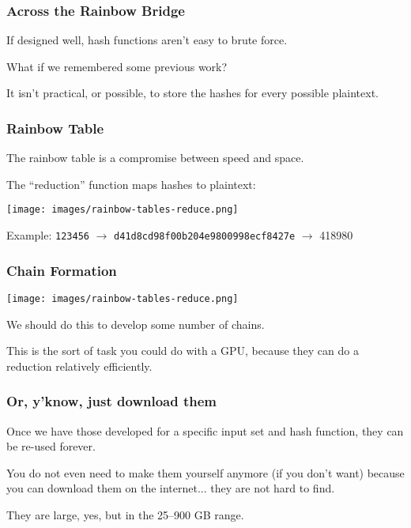 \begin{frame}
\frametitle{Across the Rainbow Bridge}

If designed well, hash functions aren't easy to brute force.

What if we remembered some previous work? 

It isn't practical, or possible, to store the hashes for every possible plaintext.

\end{frame}


\begin{frame}
\frametitle{Rainbow Table}

The rainbow table is a compromise between speed and space. 

The ``reduction'' function maps hashes to plaintext:

\begin{center}
	\texttt{[image: images/rainbow-tables-reduce.png]}
\end{center}

Example: \texttt{123456} $\rightarrow$ \texttt{d41d8cd98f00b204e9800998ecf8427e} $\rightarrow$ 418980

\end{frame}


\begin{frame}
\frametitle{Chain Formation}

\begin{center}
	\texttt{[image: images/rainbow-tables-reduce.png]}
\end{center}

We should do this to develop some number of chains. 

This is the sort of task you could do with a GPU, because they can do a reduction relatively efficiently. 

\end{frame}


\begin{frame}
\frametitle{Or, y'know, just download them}

Once we have those developed for a specific input set and hash function, they can be re-used forever. 

You do not even need to make them yourself anymore (if you don't want) because you can download them on the internet... they are not hard to find. 

They are large, yes, but in the 25--900 GB range. 


\end{frame}



